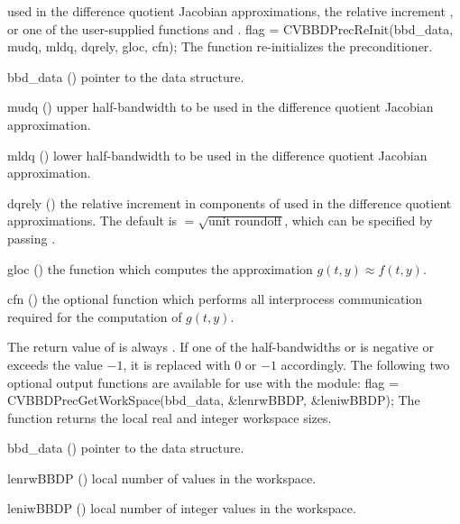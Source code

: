 used in the difference quotient Jacobian approximations, the relative increment
, or one of the user-supplied functions  and .
{
  flag = CVBBDPrecReInit(bbd\_data, mudq, mldq, dqrely, gloc, cfn);
}
{
  The function  re-initializes the {\cvbbdpre} preconditioner.
}
{
  \begin{args}
  \item[bbd\_data] ()
    pointer to the {\cvbbdpre} data structure.
  \item[mudq] ()
    upper half-bandwidth to be used in the difference quotient Jacobian approximation.
  \item[mldq] ()
    lower half-bandwidth to be used in the difference quotient Jacobian approximation.
  \item[dqrely] ()
    the relative increment in components of  used in the difference quotient
    approximations.  The default is  $= \sqrt{\text{unit roundoff}}$,
    which can be specified by passing .
  \item[gloc] ()
    the {\C} function which computes the approximation $g(t,y) \approx f(t,y)$. 
  \item[cfn] ()
    the optional {\C} function which performs all interprocess communication required for
    the computation of $g(t,y)$.
  \end{args}
}
{
  The return value of  is always .
}
{
  If one of the half-bandwidths  or  is negative or
  exceeds the value $-1$, it is replaced with 0 or
  $-1$ accordingly.
}
The following two optional output functions are available for use with
the {\cvbbdpre} module:
{
  flag = CVBBDPrecGetWorkSpace(bbd\_data, \&lenrwBBDP, \&leniwBBDP);
}
{
  The function  returns the local
  {\cvbbdpre} real and integer workspace sizes.
}
{
  \begin{args}[lenrwBBDP]
  \item[bbd\_data] ()
    pointer to the {\cvbbdpre} data structure.
  \item[lenrwBBDP] ()
    local number of  values in the {\cvbbdpre} workspace.
  \item[leniwBBDP] ()
    local number of integer values in the {\cvbbdpre} workspace.
  \end{args}
}
